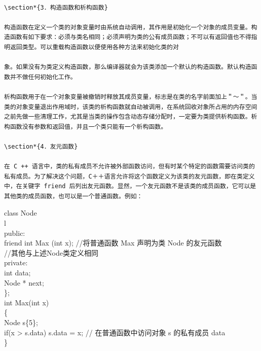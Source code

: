\documentclass[10pt]{article}
\begin{document}
\begin{verbatim}

\section*{3．构造函数和析构函数}

构造函数在定义一个类的对象变量时由系统自动调用，其作用是初始化一个对象的成员变量。构造函数有如下要求：必须与类名相同；必须声明为类的公有成员函数；不可以有返回值也不得指明返回类型。可以重载构造函数以便使用各种方法来初始化类的对

象。如果没有为类定义构造函数，那么编译器就会为该类添加一个默认的构造函数。默认构造函数并不做任何初始化工作。

析构函数用于在一个对象变量被撤销时释放其成员变量，标志是在类的名字前面加上＂～＂。当类的对象变量退出作用域时，该类的析构函数就自动被调用，在系统回收对象所占用的内存空间之前先做一些清理工作，尤其是当类的操作包含动态存储分配时，一定要为类提供析构函数。析构函数没有参数和返回值，并且一个类只能有一个析构函数。

\section*{4．友元函数}

在 C ++ 语言中，类的私有成员不允许被外部函数访问，但有时某个特定的函数需要访问类的私有成员。为了解决这个问题，C＋＋语言允许将这个函数定义为该类的友元函数，即在类定义中，在关键字 friend 后列出友元函数。显然，一个友元函数不是该类的成员函数，它可以是其他类的成员函数，也可以是一个普通函数。例如：
\end{verbatim}

class Node\\
l\\
public:\\
friend int Max (int x); //将普通函数 Max 声明为类 Node 的友元函数\\
//其他与上述Node类定义相同\\
private:\\
int data;\\
Node * next;\\
\};\\
int Max(int x)\\
\{\\
Node s\{5\};\\
if(x > s.data) s.data = x; // 在普通函数中访问对象 s 的私有成员 data\\
\}
\end{document}
